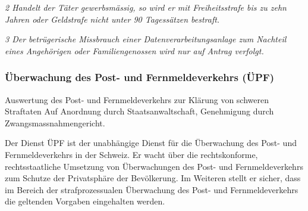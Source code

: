 \textit{2 Handelt der Täter gewerbsmässig, so wird er mit Freiheitsstrafe bis zu zehn Jahren oder Geldstrafe nicht unter 90 Tagessätzen bestraft.}

\textit{3 Der betrügerische Missbrauch einer Datenverarbeitungsanlage zum Nachteil eines Angehörigen oder Familiengenossen wird nur auf Antrag verfolgt.
}

\subsubsection*{Überwachung des Post- und Fernmeldeverkehrs (ÜPF)}

Auswertung des Post- und Fernmeldeverkehrs zur Klärung von schweren Straftaten
Auf Anordnung durch Staatsanwaltschaft, Genehmigung durch Zwangsmassnahmengericht.

Der Dienst ÜPF ist der unabhängige Dienst für die Überwachung des Post- und Fernmeldeverkehrs in der Schweiz. Er wacht über die rechtskonforme, rechtsstaatliche Umsetzung von Überwachungen des Post- und Fernmeldeverkehrs zum Schutze der Privatsphäre der Bevölkerung. Im Weiteren stellt er sicher, dass im Bereich der strafprozessualen Überwachung des Post- und Fernmeldeverkehrs die geltenden Vorgaben eingehalten werden.

